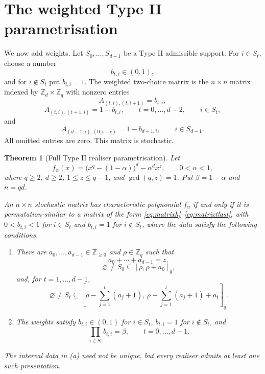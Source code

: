 \documentclass[11pt]{article}
\newtheorem{theorem}{Theorem}[section]
\theoremstyle{definition}
\theoremstyle{remark}
\begin{document}
\section{The weighted Type II parametrisation}
\label{sec:weighted}

We now add weights.  Let $S_0,\ldots,S_{d-1}$ be a Type II admissible support.  For $i\in S_t$, choose a number
\[
        b_{t,i}\in(0,1),
\]
and for $i\notin S_t$ put $b_{t,i}=1$.  The weighted two-choice matrix is the $n\times n$ matrix indexed by $\mathbb Z_d\times\mathbb Z_q$ with nonzero entries
\begin{equation}
        A_{(t,i),(t,i+1)}=b_{t,i},
        \label{eq:matrixh}
\end{equation}
\begin{equation}
        A_{(t,i),(t+1,i)}=1-b_{t,i},
        \qquad t=0,\ldots,d-2,
        \qquad i\in S_t,
        \label{eq:matrixt}
\end{equation}
and
\begin{equation}
        A_{(d-1,i),(0,i+c)}=1-b_{d-1,i},
        \qquad i\in S_{d-1}.
        \label{eq:matrixtlast}
\end{equation}
All omitted entries are zero.  This matrix is stochastic.

\begin{theorem}[Full Type II realiser parametrisation]
\label{thm:weighted}
Let
\[
        f_\alpha(x)=\bigl(x^q-(1-\alpha)\bigr)^d-\alpha^d x^z,
        \qquad 0<\alpha<1,
\]
where $q\ge2$, $d\ge2$, $1\le z\le q-1$, and $\gcd(q,z)=1$.  Put $\beta=1-\alpha$ and $n=qd$.

An $n\times n$ stochastic matrix has characteristic polynomial $f_\alpha$ if and only if it is permutation-similar to a matrix of the form \eqref{eq:matrixh}--\eqref{eq:matrixtlast}, with $0<b_{t,i}<1$ for $i\in S_t$ and $b_{t,i}=1$ for $i\notin S_t$, where the data satisfy the following conditions.
\begin{enumerate}[label=\textup{(\alph*)}]
\item There are $a_0,\ldots,a_{d-1}\in\mathbb Z_{\ge0}$ and $\rho\in\mathbb Z_q$ such that
\[
        a_0+\cdots+a_{d-1}=z,
\]
\[
        \varnothing\ne S_0\subseteq [\rho,\rho+a_0]_q,
\]
and, for $t=1,\ldots,d-1$,
\[
        \varnothing\ne S_t\subseteq
        \left[
        \rho-\sum_{j=1}^t(a_j+1),\,
        \rho-\sum_{j=1}^t(a_j+1)+a_t
        \right]_q .
\]
\item The weights satisfy $b_{t,i}\in(0,1)$ for $i\in S_t$, $b_{t,i}=1$ for $i\notin S_t$, and
\begin{equation}
        \prod_{i\in S_t}b_{t,i}=\beta,
        \qquad t=0,
        \ldots,d-1 .
        \label{eq:weightproduct}
\end{equation}
\end{enumerate}
The interval data in \textup{(a)} need not be unique, but every realiser admits at least one such presentation.
\end{theorem}
\end{document}
